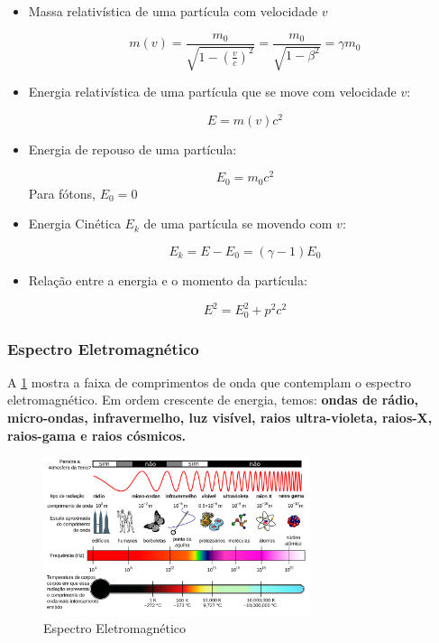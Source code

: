 \documentclass[11pt,a4paper]{article}
\begin{document}
    \begin{itemize}
		\item Massa relativística de uma partícula com velocidade $v$
		
			\begin{equation}
				m(v) = 
				\frac{m_0}{\sqrt{1 - \left(\frac{v}{c}\right)^2}} = 
				\frac{m_0}{\sqrt{1 - \beta^2}} =
				\gamma m_0
			\end{equation}

		\item Energia relativística de uma partícula que se move com velocidade $v$:
			
			\begin{equation}
				E = m(v)c^2
			\end{equation}

		\item Energia de repouso de uma partícula:
		
			\begin{equation}
				E_0 = m_0 c^2
			\end{equation}
			Para fótons, $E_0 = 0$

		\item Energia Cinética $E_k$ de uma partícula se movendo com $v$:
		
			\begin{equation}
				E_k = E - E_0 = (\gamma -1)E_0
			\end{equation}
			
		\item Relação entre a energia e o momento da partícula:
		
			\begin{equation}
				E^2 = E_0^2 + p^2c^2
			\end{equation}
	\end{itemize}        

\subsubsection*{Espectro Eletromagnético}

    A \ref{fig:espectroEM} mostra a faixa de comprimentos de onda que contemplam o espectro eletromagnético. Em ordem crescente de energia, temos: \textbf{ondas de rádio, micro-ondas, infravermelho, luz visível, raios ultra-violeta, raios-X, raios-gama e raios cósmicos.}

                \begin{figure}[h]
                    \centering
                    \includegraphics[width=0.7\textwidth]{Imagens/espectroEM.jpg}
                    \caption{Espectro Eletromagnético}
                    \label{fig:espectroEM}
                \end{figure}
\end{document}
